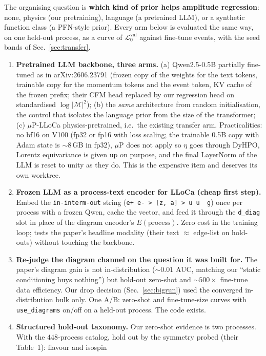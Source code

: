 \documentclass[11pt]{article}
\newcommand{\vlnr}{\mathcal{L}^{\mathrm{val}}_{0}}   %
\newcommand{\code}[1]{\texttt{#1}}
\begin{document}
The organising question is \textbf{which kind of prior helps amplitude regression}: none,
physics (our pretraining), language (a pretrained LLM), or a synthetic function class (a
PFN-style prior). Every arm below is evaluated the same way, on one held-out process, as a
curve of $\vlnr$ against fine-tune events, with the seed bands of Sec.~\ref{sec:transfer}.
\begin{enumerate}
  \item \textbf{Pretrained LLM backbone, three arms.} (a) Qwen2.5-0.5B partially fine-tuned
    as in arXiv:2606.23791 (frozen copy of the weights for the text tokens, trainable copy for
    the momentum tokens and the event token, KV cache of the frozen prefix; their CFM head
    replaced by our regression head on standardised $\log|\mathcal{M}|^2$); (b) the \emph{same}
    architecture from random initialisation, the control that isolates the language prior from
    the size of the transformer; (c) $\mu$P-LLoCa physics-pretrained, i.e.\ the existing
    transfer arm. Practicalities: no bf16 on V100 (fp32 or fp16 with loss scaling; the trainable
    0.5B copy with Adam state is ${\sim}8$\,GB in fp32), $\mu$P does not apply so $\eta$ goes
    through DyHPO, Lorentz equivariance is given up on purpose, and the final LayerNorm of the
    LLM is reset to unity as they do. This is the expensive item and deserves its own worktree.
  \item \textbf{Frozen LLM as a process-text encoder for LLoCa (cheap first step).} Embed the
    \code{in-interm-out} string (\code{e+ e- > [z, a] > u u~ g}) once per process with a frozen
    Qwen, cache the vector, and feed it through the \code{d\_diag} slot in place of the diagram
    encoder's $E(\text{process})$. Zero cost in the training loop; tests the paper's headline
    modality (their text $\approx$ edge-list on hold-outs) without touching the backbone.
  \item \textbf{Re-judge the diagram channel on the question it was built for.} The paper's
    diagram gain is not in-distribution (${\sim}0.01$ AUC, matching our ``static conditioning
    buys nothing'') but hold-out zero-shot and ${\sim}500\times$ fine-tune data efficiency.
    Our drop decision (Sec.~\ref{sec:bigrun}) used the converged in-distribution bulk only. One
    A/B: zero-shot and fine-tune-size curves with \code{use\_diagrams} on/off on a held-out
    process. The code exists.
  \item \textbf{Structured hold-out taxonomy.} Our zero-shot evidence is two processes. With the
    $448$-process catalog, hold out by the symmetry probed (their Table~1): flavour and isospin

\end{enumerate}
\end{document}
